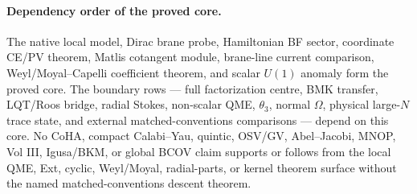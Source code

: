 \medskip
\paragraph{Dependency order of the proved core.}
The native local model, Dirac brane probe, Hamiltonian BF sector,
coordinate CE/PV theorem, Matlis cotangent module, brane-line current
comparison, Weyl/Moyal--Capelli coefficient theorem, and scalar
\(U(1)\) anomaly form the proved core.  The boundary rows
--- full factorization centre, BMK transfer, LQT/Roos bridge,
radial Stokes, non-scalar QME, \(\theta_3\), normal \(\Omega\),
physical large-\(N\) trace state, and external matched-conventions
comparisons --- depend on this core.  No CoHA, compact Calabi--Yau,
quintic, OSV/GV, Abel--Jacobi, MNOP, Vol III, Igusa/BKM, or global
BCOV claim supports or follows from the local QME, Ext, cyclic,
Weyl/Moyal, radial-parts, or kernel theorem surface without the named
matched-conventions descent theorem.

\medskip

